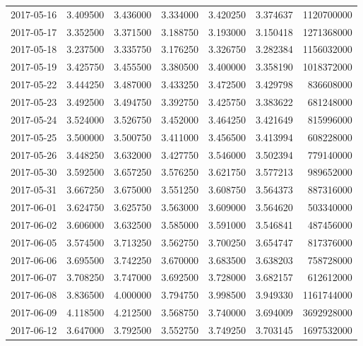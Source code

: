 \begin{tabular}{lrrrrrr}
2017-05-16 &    3.409500 &    3.436000 &    3.334000 &    3.420250 &    3.374637 &  1120700000 \\
2017-05-17 &    3.352500 &    3.371500 &    3.188750 &    3.193000 &    3.150418 &  1271368000 \\
2017-05-18 &    3.237500 &    3.335750 &    3.176250 &    3.326750 &    3.282384 &  1156032000 \\
2017-05-19 &    3.425750 &    3.455500 &    3.380500 &    3.400000 &    3.358190 &  1018372000 \\
2017-05-22 &    3.444250 &    3.487000 &    3.433250 &    3.472500 &    3.429798 &   836608000 \\
2017-05-23 &    3.492500 &    3.494750 &    3.392750 &    3.425750 &    3.383622 &   681248000 \\
2017-05-24 &    3.524000 &    3.526750 &    3.452000 &    3.464250 &    3.421649 &   815996000 \\
2017-05-25 &    3.500000 &    3.500750 &    3.411000 &    3.456500 &    3.413994 &   608228000 \\
2017-05-26 &    3.448250 &    3.632000 &    3.427750 &    3.546000 &    3.502394 &   779140000 \\
2017-05-30 &    3.592500 &    3.657250 &    3.576250 &    3.621750 &    3.577213 &   989652000 \\
2017-05-31 &    3.667250 &    3.675000 &    3.551250 &    3.608750 &    3.564373 &   887316000 \\
2017-06-01 &    3.624750 &    3.625750 &    3.563000 &    3.609000 &    3.564620 &   503340000 \\
2017-06-02 &    3.606000 &    3.632500 &    3.585000 &    3.591000 &    3.546841 &   487456000 \\
2017-06-05 &    3.574500 &    3.713250 &    3.562750 &    3.700250 &    3.654747 &   817376000 \\
2017-06-06 &    3.695500 &    3.742250 &    3.670000 &    3.683500 &    3.638203 &   758728000 \\
2017-06-07 &    3.708250 &    3.747000 &    3.692500 &    3.728000 &    3.682157 &   612612000 \\
2017-06-08 &    3.836500 &    4.000000 &    3.794750 &    3.998500 &    3.949330 &  1161744000 \\
2017-06-09 &    4.118500 &    4.212500 &    3.568750 &    3.740000 &    3.694009 &  3692928000 \\
2017-06-12 &    3.647000 &    3.792500 &    3.552750 &    3.749250 &    3.703145 &  1697532000 \\

\end{tabular}
